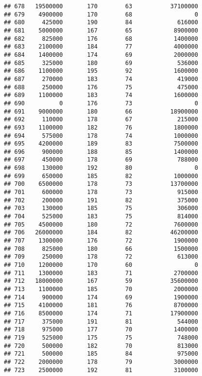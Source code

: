 \documentclass[
]{article}
\begin{document}
\begin{verbatim}
## 678   19500000       170        63           37100000
## 679    4900000       170        68                  0
## 680     425000       190        84             616000
## 681    5000000       167        65            8900000
## 682     825000       176        68            1400000
## 683    2100000       184        77            4000000
## 684    1400000       174        69            2000000
## 685     325000       180        69             536000
## 686    1100000       195        92            1600000
## 687     270000       183        74             419000
## 688     250000       176        75             475000
## 689    1100000       183        74            1600000
## 690          0       176        73                  0
## 691    9000000       180        66           18900000
## 692     110000       178        67             215000
## 693    1100000       182        76            1800000
## 694     575000       178        74            1000000
## 695    4200000       189        83            7500000
## 696     900000       188        85            1400000
## 697     450000       178        69             788000
## 698     130000       192        80                  0
## 699     650000       185        82            1000000
## 700    6500000       178        73           13700000
## 701     600000       178        73             915000
## 702     200000       191        82             375000
## 703     130000       185        75             306000
## 704     525000       183        75             814000
## 705    4500000       180        72            7600000
## 706   26000000       184        82           46200000
## 707    1300000       176        72            1900000
## 708     825000       180        66            1500000
## 709     250000       178        72             613000
## 710    1200000       170        60                  0
## 711    1300000       183        71            2700000
## 712   18000000       167        59           35600000
## 713    1100000       185        70            2000000
## 714     900000       174        69            1900000
## 715    4100000       181        76            8700000
## 716    8500000       174        71           17900000
## 717     375000       191        81             544000
## 718     975000       177        70            1400000
## 719     525000       175        75             748000
## 720     500000       182        70             813000
## 721     500000       185        84             975000
## 722    2000000       178        79            3000000
## 723    2500000       192        81            3100000

\end{verbatim}
\end{document}

